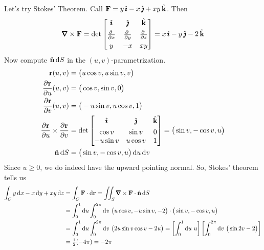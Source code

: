 \begin{solution} 
Let's try Stokes' Theorem. Call $\mathbf{F}=y\,\hat{\pmb{\imath}}-x\,\hat{\pmb{\jmath}}+xy\,\hat{\mathbf{k}}$. Then
\begin{align*}
\vnabla\times\vF=\det\left[\begin{matrix}\hi & \hj & \hk \\[0.05in]
                  \pdiff{}{x} &
                  \pdiff{}{y} &
                  \pdiff{}{z} \\[0.05in]
                  y & -x & xy \end{matrix}\right] 
=x\,\hi-y\,\hj-2\,\hk
\end{align*}
Now compute $\hat{\mathbf{n}}\,\mathrm{d}S$ in the $(u,v)$-parametrization.
\begin{align*}
\vr(u,v)&=\big(u\cos v, u\sin v, v\big)\\
\pdiff{\vr}{u}(u,v)&=\big(\cos v, \sin v, 0\big)\\
\pdiff{\vr}{v}(u,v)&=\big(-u\sin v, u\cos v, 1\big)\\
\pdiff{\vr}{u}\times\pdiff{\vr}{v}
&=\det\left[\begin{matrix}\hi & \hj & \hk \\[0.05in]
                  \cos v & \sin v & 0 \\
                  -u\sin v& u\cos v& 1 \end{matrix}\right] 
=\big(\sin v, -\cos v, u\big)\\
\hn\,\dee{S}&=\big(\sin v, -\cos v, u\big)\,\dee{u}\,\dee{v}
\end{align*}
Since $u\ge 0$, we do indeed have the upward pointing normal.
So, Stokes' theorem tells us
\begin{align*}
\int_C y\,\dee{x}-x\,\dee{y}+ xy\,\dee{z}
&=\int_C\vF\cdot \dee{\vr}
=\dblInt_S \vnabla\times\vF\cdot\hn\,\dee{S}\\
&=\int_0^1 \dee{u} \int_0^{2\pi} \dee{v}\  \big(u\cos v, -u\sin v, -2\big)
\cdot\big(\sin v, -\cos v, u\big)\\
&=\int_0^1 \dee{u} \int_0^{2\pi} \dee{v}\ \big(2u\sin v\cos v-2u\big)
=\left[\int_0^1 \dee{u} \ u\right]
    \left[\int_0^{2\pi} \dee{v}\ \big(\sin 2v-2\big)\right]\\
&=\half(-4\pi)=-2\pi
\end{align*}
\end{solution}





\subsection*{\Application}

